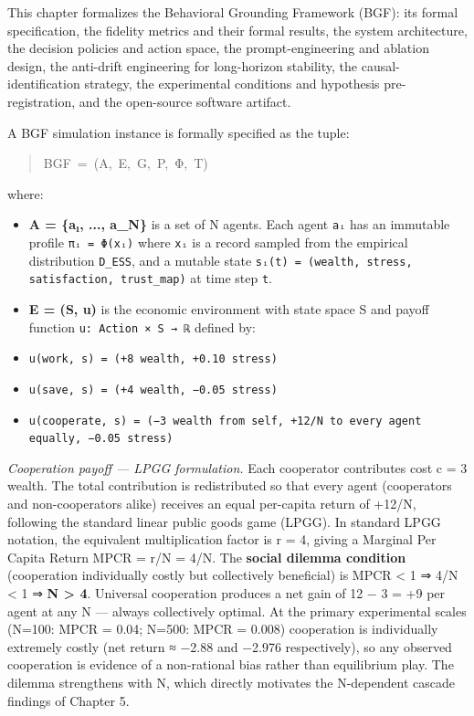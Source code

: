 
This chapter formalizes the Behavioral Grounding Framework (BGF): its formal specification, the fidelity metrics and their formal results, the system architecture, the decision policies and action space, the prompt-engineering and ablation design, the anti-drift engineering for long-horizon stability, the causal-identification strategy, the experimental conditions and hypothesis pre-registration, and the open-source software artifact.


A BGF simulation instance is formally specified as the tuple:

\begin{quote}\ttfamily\small\noindent
BGF~=~(A,~E,~G,~P,~Φ,~T)
\end{quote}

where:

\begin{itemize}
\item \textbf{A = \{a₁, ..., a\_N\}} is a set of N agents. Each agent \texttt{aᵢ} has an immutable profile \texttt{πᵢ = Φ(xᵢ)} where \texttt{xᵢ} is a record sampled from the empirical distribution \texttt{D\_ESS}, and a mutable state \texttt{sᵢ(t) = (wealth, stress, satisfaction, trust\_map)} at time step \texttt{t}.
\end{itemize}

\begin{itemize}
\item \textbf{E = (S, u)} is the economic environment with state space S and payoff function \texttt{u: Action × S → ℝ} defined by:
\item \texttt{u(work, s) = (+8 wealth, +0.10 stress)}
\item \texttt{u(save, s) = (+4 wealth, −0.05 stress)}
\item \texttt{u(cooperate, s) = (−3 wealth from self, +12/N to every agent equally, −0.05 stress)}
\end{itemize}

  \textit{Cooperation payoff — LPGG formulation.} Each cooperator contributes cost c = 3 wealth. The total contribution is redistributed so that every agent (cooperators and non-cooperators alike) receives an equal per-capita return of +12/N, following the standard linear public goods game (LPGG). In standard LPGG notation, the equivalent multiplication factor is r = 4, giving a Marginal Per Capita Return MPCR = r/N = 4/N. The \textbf{social dilemma condition} (cooperation individually costly but collectively beneficial) is MPCR < 1 ⇒ 4/N < 1 ⇒ \textbf{N > 4}. Universal cooperation produces a net gain of 12 − 3 = +9 per agent at any N — always collectively optimal. At the primary experimental scales (N=100: MPCR = 0.04; N=500: MPCR = 0.008) cooperation is individually extremely costly (net return ≈ −2.88 and −2.976 respectively), so any observed cooperation is evidence of a non-rational bias rather than equilibrium play. The dilemma strengthens with N, which directly motivates the N-dependent cascade findings of Chapter 5.

